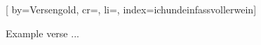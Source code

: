 

[%
    by={Versengold},
    cr={},
    li={},
    index={ichundeinfassvollerwein}]


    \label{ichundeinfassvollerwein}

    \beginverse
        Example verse ...
    \endverse
\endsong
